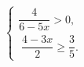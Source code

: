 \begin{ex}[type=ineq_system]
	\begin{condition}
		$\begin{cases}  \dfrac{4}{6 - 5x}>0 ,\\
			\; \dfrac{4 - 3x}{2}\geqslant\dfrac{3}{5}  .
		\end{cases}$
	\end{condition}
	\answer{$  \left(-\infty;\dfrac{14}{15}\right].$}
\end{ex}